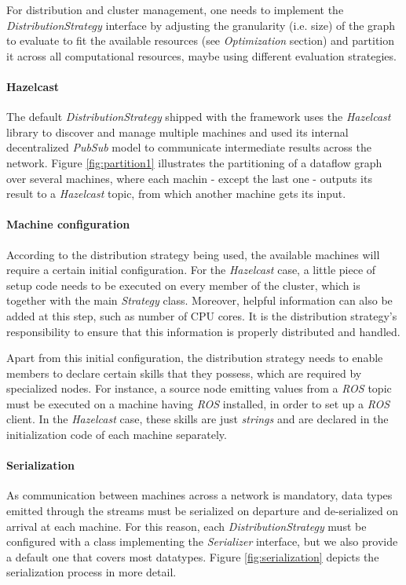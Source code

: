 \documentclass[sigplan,review,anonymous]{acmart}
\begin{document}
For distribution and cluster management, one needs to implement
the \textit{DistributionStrategy} interface by adjusting the granularity (i.e. size) of
the graph to evaluate to fit the available resources (see \textit{Optimization} section)
and partition it across all computational resources, maybe using different evaluation strategies.

\paragraph{Hazelcast}
The default \textit{DistributionStrategy} shipped with the framework uses
the \textit{Hazelcast}~\cite{hazelcast} library to discover and
manage multiple machines and used its internal decentralized \textit{PubSub} model to communicate
intermediate results across the network. Figure \ref{fig:partition1} illustrates
the partitioning of a dataflow graph over several machines, where each machin
- except the last one - outputs its result to a \textit{Hazelcast} topic, from which
another machine gets its input.


\paragraph{Machine configuration}
According to the distribution strategy being used, the available machines will
require a certain initial configuration. For the \textit{Hazelcast} case, a
little piece of setup code needs to be executed on every member of the cluster,
which is together with the main \textit{Strategy} class. Moreover, helpful
information can also be added at this step, such as number of CPU cores. It is
the distribution strategy's responsibility to ensure that this information is
properly distributed and handled.

Apart from this initial configuration, the distribution strategy needs to enable
members to declare certain skills that they possess, which are required by
specialized nodes. For instance, a source node emitting values from a
\textit{ROS} topic must be executed on a machine having \textit{ROS} installed,
in order to set up a \textit{ROS} client. In the \textit{Hazelcast} case, these
skills are just \textit{strings} and are declared in the initialization code of
each machine separately.

\paragraph{Serialization}
As communication between machines across a network is mandatory, data types
emitted through the streams must be serialized on departure and de-serialized on
arrival at each machine. For this reason, each \textit{DistributionStrategy}
must be configured with a class implementing the \textit{Serializer} interface,
but we also provide a default one that covers most datatypes. Figure \ref{fig:serialization}
depicts the serialization process in more detail.
\end{document}
